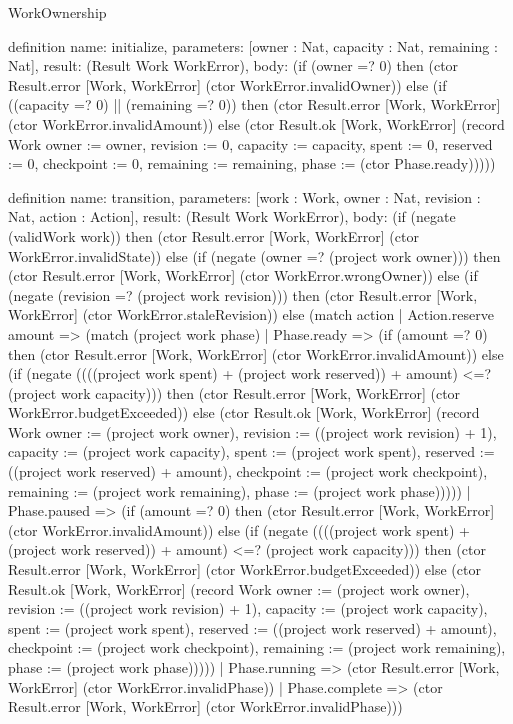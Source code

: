 \begin{lexlean}{WorkOwnership}
\begin{semanticmodule}
definition{
  name: initialize,
  parameters: [owner : Nat, capacity : Nat, remaining : Nat],
  result: (Result Work WorkError),
  body: (if (owner =? 0) then (ctor Result.error [Work, WorkError] (ctor WorkError.invalidOwner)) else (if ((capacity =? 0) || (remaining =? 0)) then (ctor Result.error [Work, WorkError] (ctor WorkError.invalidAmount)) else (ctor Result.ok [Work, WorkError] (record Work {owner := owner, revision := 0, capacity := capacity, spent := 0, reserved := 0, checkpoint := 0, remaining := remaining, phase := (ctor Phase.ready)}))))
}

definition{
  name: transition,
  parameters: [work : Work, owner : Nat, revision : Nat, action : Action],
  result: (Result Work WorkError),
  body: (if (negate (validWork work)) then (ctor Result.error [Work, WorkError] (ctor WorkError.invalidState)) else (if (negate (owner =? (project work owner))) then (ctor Result.error [Work, WorkError] (ctor WorkError.wrongOwner)) else (if (negate (revision =? (project work revision))) then (ctor Result.error [Work, WorkError] (ctor WorkError.staleRevision)) else (match action
    | Action.reserve amount => (match (project work phase)
      | Phase.ready => (if (amount =? 0) then (ctor Result.error [Work, WorkError] (ctor WorkError.invalidAmount)) else (if (negate ((((project work spent) + (project work reserved)) + amount) <=? (project work capacity))) then (ctor Result.error [Work, WorkError] (ctor WorkError.budgetExceeded)) else (ctor Result.ok [Work, WorkError] (record Work {owner := (project work owner), revision := ((project work revision) + 1), capacity := (project work capacity), spent := (project work spent), reserved := ((project work reserved) + amount), checkpoint := (project work checkpoint), remaining := (project work remaining), phase := (project work phase)}))))
      | Phase.paused => (if (amount =? 0) then (ctor Result.error [Work, WorkError] (ctor WorkError.invalidAmount)) else (if (negate ((((project work spent) + (project work reserved)) + amount) <=? (project work capacity))) then (ctor Result.error [Work, WorkError] (ctor WorkError.budgetExceeded)) else (ctor Result.ok [Work, WorkError] (record Work {owner := (project work owner), revision := ((project work revision) + 1), capacity := (project work capacity), spent := (project work spent), reserved := ((project work reserved) + amount), checkpoint := (project work checkpoint), remaining := (project work remaining), phase := (project work phase)}))))
      | Phase.running => (ctor Result.error [Work, WorkError] (ctor WorkError.invalidPhase))
      | Phase.complete => (ctor Result.error [Work, WorkError] (ctor WorkError.invalidPhase)))
}
\end{semanticmodule}
\end{lexlean}
